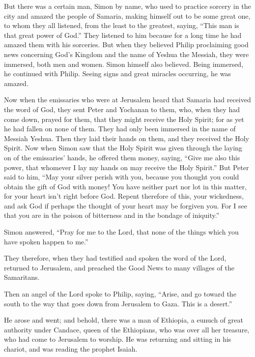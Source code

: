 \myverse{}But there was a certain man, Simon by name, who used to practice
sorcery in the city and amazed the people of Samaria, making himself out to be some great one,
\myverse{}to whom they all listened, from the least to the greatest, saying, “This man
is that great power of God.”
\myverse{}They listened to him because for a long time he had amazed them with his sorceries.
\myverse{}But when they believed Philip proclaiming good news concerning God’s Kingdom
and the name of Yeshua the Messiah, they were immersed, both men and women.
\myverse{}Simon himself also believed. Being immersed, he continued with Philip. Seeing
signs and great miracles occurring, he was amazed.

\myverse{}Now when the emissaries who were at Jerusalem heard that Samaria
had received the word of God, they sent Peter and Yochanan to them,
\myverse{}who, when they had come down, prayed for them, that they might receive the
Holy Spirit;
\myverse{}for as yet he had fallen on none of them. They had only been immersed in the
name of Messiah Yeshua.
\myverse{}Then they laid their hands on them, and they received the Holy Spirit.
\myverse{}Now when Simon saw that the Holy Spirit was given through the laying on of
the emissaries’ hands, he offered them money,
\myverse{}saying, “Give me also this power, that whomever I lay my hands on may receive
the Holy Spirit.”
\myverse{}But Peter said to him, “May your silver perish with you, because you thought
you could obtain the gift of God with money!
\myverse{}You have neither part nor lot in this matter, for your heart isn’t right before
God.
\myverse{}Repent therefore of this, your wickedness, and ask God if perhaps the thought
of your heart may be forgiven you.
\myverse{}For I see that you are in the poison of bitterness and in the bondage of iniquity.”

\myverse{}Simon answered, “Pray for me to the Lord, that none of the things
which you have spoken happen to me.”

\myverse{}They therefore, when they had testified and spoken the word of
the Lord, returned to Jerusalem, and preached the Good News to many villages of the Samaritans.

\myverse{}Then an angel of the Lord spoke to Philip, saying, “Arise, and
go toward the south to the way that goes down from Jerusalem to Gaza. This is a desert.”

\myverse{}He arose and went; and behold, there was a man of Ethiopia, a eunuch
of great authority under Candace, queen of the Ethiopians, who was over all her treasure, who had come
to Jerusalem to worship.
\myverse{}He was returning and sitting in his chariot, and was reading the prophet Isaiah.

